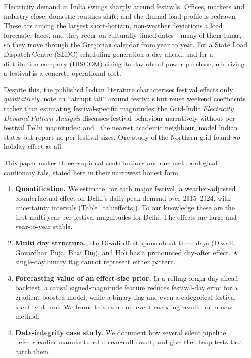 \documentclass[11pt]{article}
\begin{document}
Electricity demand in India swings sharply around festivals. Offices, markets and
industry close; domestic routines shift; and the diurnal load profile is
redrawn. These are among the largest short-horizon, non-weather deviations a load
forecaster faces, and they recur on culturally-timed dates---many of them lunar,
so they move through the Gregorian calendar from year to year. For a State Load
Dispatch Centre (SLDC) scheduling generation a day ahead, and for a distribution
company (DISCOM) sizing its day-ahead power purchase, mis-sizing a festival is a
concrete operational cost.

Despite this, the published Indian literature characterises festival effects only
\emph{qualitatively}. \citet{gaur2016} note an ``abrupt fall'' around festivals
but reuse weekend coefficients rather than estimating festival-specific
magnitudes; the Grid-India \emph{Electricity Demand Pattern Analysis}
\citep{gridindia2023} discusses festival behaviour narratively without per-festival
Delhi magnitudes; and \citet{hunt2025}, the nearest academic neighbour, model
Indian states but report no per-festival sizes. One study of the Northern grid
\citep{banerjee2010} found \emph{no} holiday effect at all.

This paper makes three empirical contributions and one methodological cautionary
tale, stated here in their narrowest honest form.

\begin{enumerate}
\item \textbf{Quantification.} We estimate, for each major festival, a
  weather-adjusted counterfactual effect on Delhi's daily peak demand over
  2015--2024, with uncertainty intervals (Table~\ref{tab:effects}). To our
  knowledge these are the first multi-year per-festival magnitudes for Delhi. The
  effects are large and year-to-year stable.
\item \textbf{Multi-day structure.} The Diwali effect spans about three days
  (Diwali, Govardhan Puja, Bhai Duj), and Holi has a pronounced day-after effect.
  A single-day binary flag cannot represent either pattern.
\item \textbf{Forecasting value of an effect-size prior.} In a rolling-origin
  day-ahead backtest, a causal signed-magnitude feature reduces festival-day
  error for a gradient-boosted model, while a binary flag and even a categorical
  festival identity do not. We frame this as a rare-event encoding result, not a
  new method.
\item \textbf{Data-integrity case study.} We document how several silent pipeline
  defects earlier manufactured a near-null result, and give the cheap tests that
  catch them.
\end{enumerate}
\end{document}
